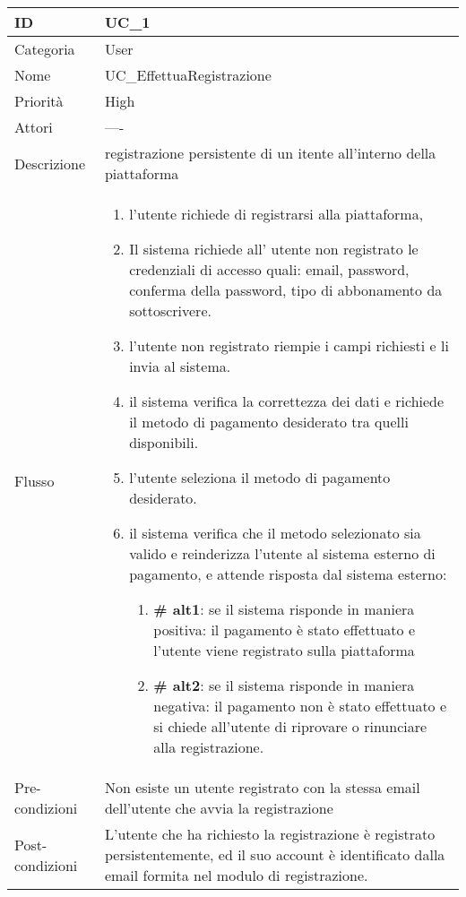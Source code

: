 \begin{center}
\begin{tabular}{ |p{2cm}|p{13cm}|  }
\hline
ID & UC\_1 \\\hline
Categoria & User \\\hline
Nome & UC\_EffettuaRegistrazione \\\hline
Priorità & High \\\hline
Attori &  ---- \\\hline
Descrizione & registrazione persistente di un itente all'interno della piattaforma \\\hline
Flusso &  	\begin{enumerate}
			\item l'utente richiede di registrarsi alla piattaforma,
			\item Il sistema richiede all' utente non registrato le credenziali di accesso quali: email, password, conferma della password, tipo di abbonamento da sottoscrivere.
			\item l'utente non registrato riempie i campi richiesti e li invia al sistema.
			\item il sistema verifica la correttezza dei dati e richiede il metodo di pagamento desiderato tra quelli disponibili.
			\item l'utente seleziona il metodo di pagamento desiderato.
			\item il sistema verifica che il metodo selezionato sia valido e reinderizza l'utente al sistema esterno di pagamento, e attende risposta dal sistema esterno:
			\begin{enumerate}[  ]
				\item \textbf{\# alt1}: se il sistema risponde in maniera positiva: il pagamento è stato effettuato e l'utente viene registrato sulla piattaforma 
				\item \textbf{\# alt2}: se il sistema risponde in maniera negativa: il pagamento non è stato effettuato e si chiede all'utente di riprovare o rinunciare alla registrazione.
			\end{enumerate}
		\end{enumerate}\\\hline
Pre-condizioni &  Non esiste un utente registrato con la stessa email dell'utente che avvia la registrazione\\\hline
Post-condizioni &  L'utente che ha richiesto la registrazione è registrato persistentemente, ed il suo account è identificato dalla email formita nel modulo di registrazione.\\\hline
\end{tabular}
\label{table_use_case:1}\newline


\end{center}
